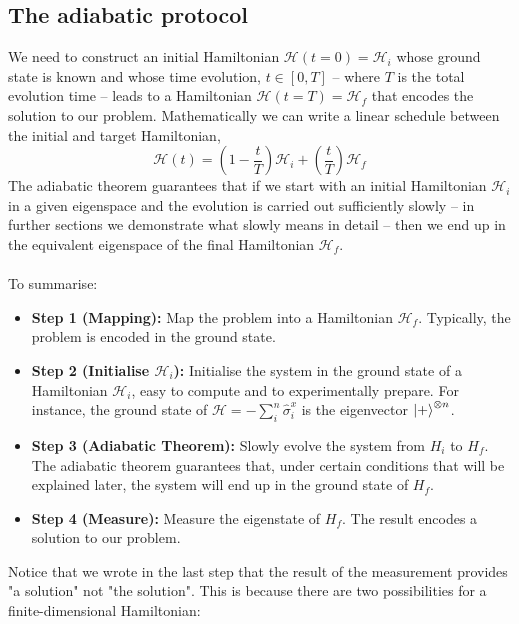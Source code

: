 \subsection{The adiabatic protocol}
We need to construct an initial Hamiltonian $\mathcal{H}(t=0) = \mathcal{H}_{i}$ whose ground state is known and whose time evolution, $t \in \left[0,T\right]$ -- where $T$ is the total evolution time -- leads to a Hamiltonian $\mathcal{H}(t=T) = \mathcal{H}_{f}$ that encodes the solution to our problem. Mathematically we can write a linear schedule between the initial and target Hamiltonian,
\begin{equation}
\label{eq:Htime}
    \mathcal{H}(t) = \left(1-\frac{t}{T}\right)\mathcal{H}_{i} + \left(\frac{t}{T} \right)\mathcal{H}_{f}
\end{equation}
The adiabatic theorem guarantees that if we start with an initial Hamiltonian $\mathcal{H}_{i}$ in a given eigenspace and the evolution is carried out sufficiently slowly -- in further sections we demonstrate what slowly means in detail -- then we end up in the equivalent eigenspace of the final Hamiltonian $\mathcal{H}_{f}$. \\\\
To summarise:
\begin{itemize}
    \item \textbf{Step 1 (Mapping):} Map the problem into a Hamiltonian $\mathcal{H}_{f}$. Typically, the problem is encoded in the ground state.
    \item \textbf{Step 2 (Initialise $\mathcal{H}_{i}$):} Initialise the system in the ground state of a Hamiltonian $\mathcal{H}_{i}$, easy to compute and to experimentally prepare. For instance, the ground state of $\mathcal{H} = - \sum_{i}^{n}\hat{\sigma}_{i}^{x}$ is the eigenvector $\ket{+}^{\otimes n}$.
    \item \textbf{Step 3 (Adiabatic Theorem):} Slowly evolve the system from $H_{i}$ to $H_{f}$. The adiabatic theorem guarantees that, under certain conditions that will be explained later, the system will end up in the ground state of $H_{f}$.
    \item \textbf{Step 4 (Measure):} Measure the eigenstate of $H_{f}$. The result encodes a solution to our problem.
\end{itemize}
Notice that we wrote in the last step that the result of the measurement provides "a solution" not "the solution". This is because there are two possibilities for a finite-dimensional Hamiltonian:
